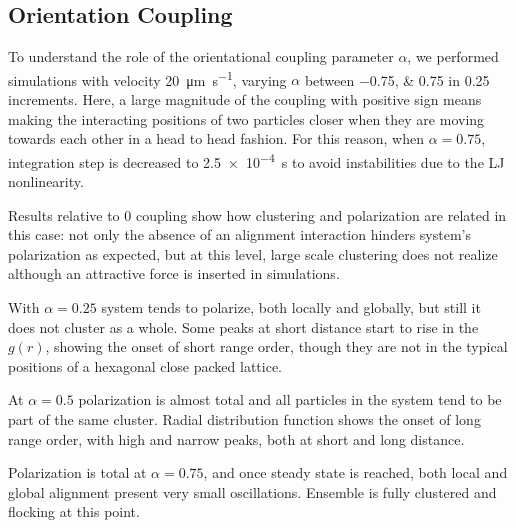 \documentclass[../../master_thesis_np.tex]{subfiles}
\begin{document}
		
		\subsection{Orientation Coupling}
		To understand the role of the orientational coupling parameter $\alpha$, we performed simulations with velocity \SI{20}{\um\per\second}, varying $\alpha$ between \numlist{-0.75; 0.75} in \num{0.25} increments. 
		Here, a large magnitude of the coupling with positive sign means making the interacting positions of two particles closer when they are moving towards each other in a head to head fashion.
		For this reason, when $\alpha = 0.75$, integration step is decreased to \SI{2.5e-4}{\second} to avoid instabilities due to the LJ nonlinearity.
		
		Results relative to \num{0} coupling show how clustering and polarization are related in this case: not only the absence of an alignment interaction hinders system's polarization as expected, but at this level, large scale clustering does not realize although an attractive force is inserted in simulations.
		
		With $\alpha = 0.25$ system tends to polarize, both locally and globally, but still it does not cluster as a whole. 
		Some peaks at short distance start to rise in the $g(r)$, showing the onset of short range order, though they are not in the typical positions of a hexagonal close packed lattice.
		
		At $\alpha = 0.5$ polarization is almost total and all particles in the system tend to be part of the same cluster.
		Radial distribution function shows the onset of long range order, with high and narrow peaks, both at short and long distance.
		
		Polarization is total at $\alpha = 0.75$, and once steady state is reached, both local and global alignment present very small oscillations.
		Ensemble is fully clustered and flocking at this point.
		
\end{document}
